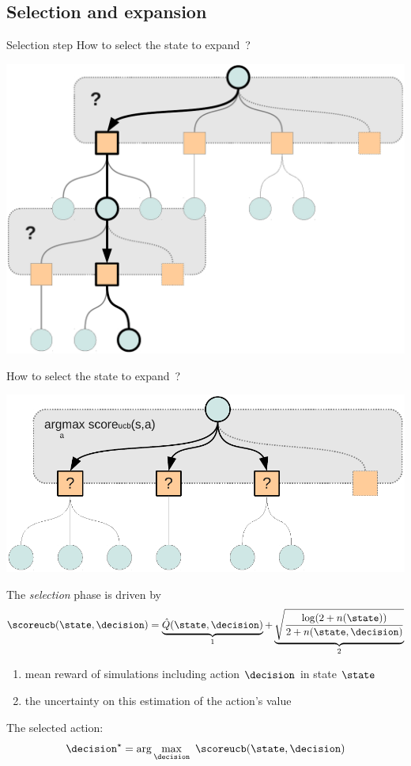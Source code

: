 \subsection{Selection and expansion}

\begin{frame}{Selection step}
    How to select the state to expand~?
    \begin{center}
        \includegraphics[width=.80\linewidth]{figs/tree3}
    \end{center}
\end{frame}


\begin{frame}{How to select the state to expand~?}
    \begin{center}
        \includegraphics[width=.40\linewidth]{figs/tree4}
    \end{center}
    The {\em selection} phase is driven by \ucb{}%
    $$
    \scoreucb(\state, \decision) = \underbrace{\hat{Q}(\state,\decision)}_\text{1} + \underbrace{\sqrt{ \frac{\log(2 + n(\state))}{2 + n(\state, \decision)} }}_\text{2}
    $$
     {
        \begin{enumerate}
            \item mean reward of simulations including action $\decision$ in state $\state$
            \item the uncertainty on this estimation of the action’s value
        \end{enumerate}
    }
     {
        The selected action: $$\decision^\star = \arg\max_{\decision} ~ \scoreucb(\state, \decision)$$
        ~\\
    }
    ~\\
\end{frame}


